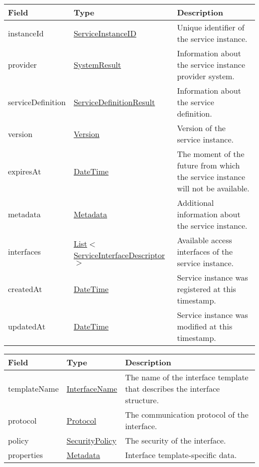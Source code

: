 \documentclass[a4paper]{arrowhead}
\newcommand{\pref}[1]{{\textcolor{ArrowheadGrey}{\hyperref[sec:model:primitives:#1]{#1}}}}
\begin{document}
\begin{table}[ht!]
\begin{tabularx}{\textwidth}{| p{2.8cm} | p{5.2cm} | X |} \hline
\rowcolor{gray!33} Field & Type      & Description \\ \hline
instanceId & \pref{ServiceInstanceID} & Unique identifier of the service instance. \\ \hline
provider & \hyperref[sec:model:SystemResult]{SystemResult} & Information about the service instance provider system. \\ \hline
serviceDefinition & \hyperref[sec:model:ServiceDefinitionResult]{ServiceDefinitionResult} & Information about the service definition. \\ \hline
version & \pref{Version} & Version of the service instance. \\ \hline
expiresAt & \pref{DateTime} & The moment of the future from which the service ins\-tance will not be available. \\ \hline
metadata & \hyperref[sec:model:Metadata]{Metadata} & Additional information about the service ins\-tance. \\ \hline
interfaces & \pref{List}$<$\hyperref[sec:model:ServiceInterfaceDescriptor]{ServiceInterfaceDescriptor}$>$ & Available access interfaces of the service instance. \\ \hline
createdAt & \pref{DateTime} & Service instance was registered at this timestamp. \\ \hline
updatedAt & \pref{DateTime} & Service instance was modified at this timestamp. \\ \hline
\end{tabularx}
\end{table}

\clearpage

 
\begin{table}[ht!]
\begin{tabularx}{\textwidth}{| p{2.5cm} | p{3cm} | X |} \hline
\rowcolor{gray!33} Field & Type & Description \\ \hline
templateName & \pref{InterfaceName} & The name of the interface template that describes the interface structure. \\ \hline
protocol & \pref{Protocol} & The communication protocol of the interface. \\ \hline
policy & \pref{SecurityPolicy} & The security of the interface. \\ \hline
properties &\hyperref[sec:model:Metadata]{Metadata} & Interface template-specific data. \\ \hline
\end{tabularx}
\end{table}
\end{document}
